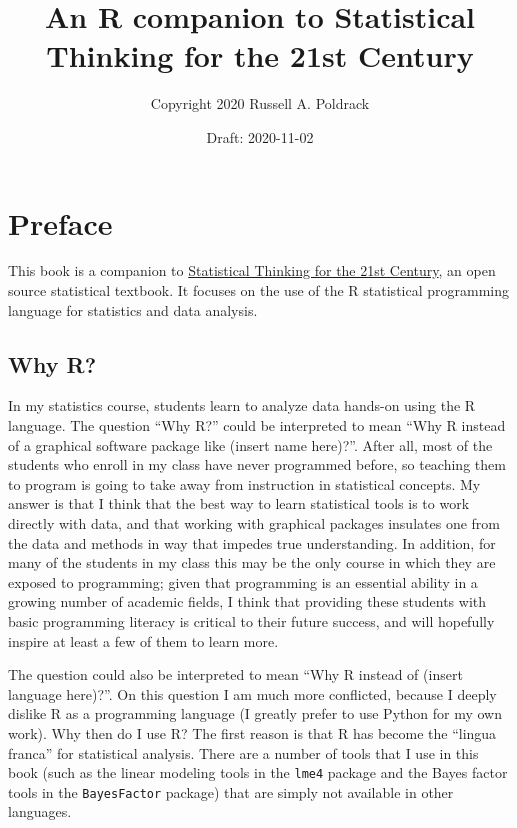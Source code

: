 \documentclass[12pt,]{book}
\title{An R companion to Statistical Thinking for the 21st Century}
\author{Copyright 2020 Russell A. Poldrack}
\date{Draft: 2020-11-02}
\begin{document}
\maketitle

{
\setcounter{tocdepth}{1}
\tableofcontents
}
\hypertarget{preface}{%
\chapter*{Preface}\label{preface}}

This book is a companion to \href{https://statsthinking21.org/}{Statistical Thinking for the 21st Century}, an open source statistical textbook. It focuses on the use of the R statistical programming language for statistics and data analysis.

\hypertarget{why-r}{%
\section{Why R?}\label{why-r}}

In my statistics course, students learn to analyze data hands-on using the R language. The question ``Why R?'' could be interpreted to mean ``Why R instead of a graphical software package like (insert name here)?''. After all, most of the students who enroll in my class have never programmed before, so teaching them to program is going to take away from instruction in statistical concepts. My answer is that I think that the best way to learn statistical tools is to work directly with data, and that working with graphical packages insulates one from the data and methods in way that impedes true understanding. In addition, for many of the students in my class this may be the only course in which they are exposed to programming; given that programming is an essential ability in a growing number of academic fields, I think that providing these students with basic programming literacy is critical to their future success, and will hopefully inspire at least a few of them to learn more.

The question could also be interpreted to mean ``Why R instead of (insert language here)?''. On this question I am much more conflicted, because I deeply dislike R as a programming language (I greatly prefer to use Python for my own work). Why then do I use R? The first reason is that R has become the ``lingua franca'' for statistical analysis. There are a number of tools that I use in this book (such as the linear modeling tools in the \texttt{lme4} package and the Bayes factor tools in the \texttt{BayesFactor} package) that are simply not available in other languages.
\end{document}
